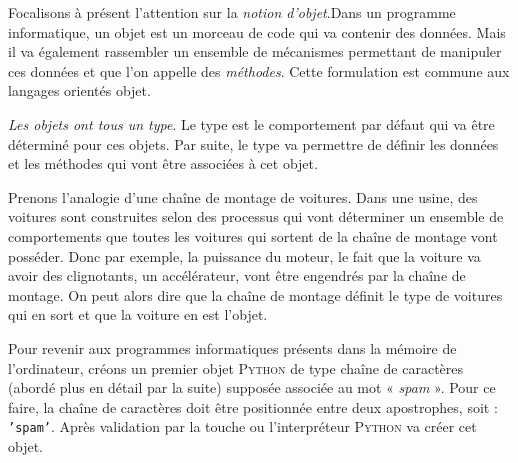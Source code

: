 Focalisons à présent l'attention sur la \emph{notion d'objet}.\nopagebreak Dans un programme informatique, un objet est un morceau de code qui va contenir des données. Mais il va également rassembler \pagebreak un ensemble de mécanismes permettant de manipuler ces données et que l'on appelle des \emph{méthodes}. Cette formulation est commune aux langages orientés objet.

\emph{Les objets ont tous un type}. Le type est le comportement par défaut qui va être déterminé pour ces objets. Par suite, le type va permettre de définir les données et les méthodes qui vont être associées à cet objet.

Prenons l'analogie d'une chaîne de montage de voitures. Dans une usine, des voitures sont construites selon des processus qui vont déterminer un ensemble de comportements que toutes les voitures qui sortent de la chaîne de montage vont posséder. Donc par exemple, la puissance du moteur, le fait que la voiture va avoir des clignotants, un accélérateur, vont être engendrés par la chaîne de montage. On peut alors dire que la chaîne de montage définit le type de voitures qui en sort et que la voiture en est l'objet.

Pour revenir aux programmes informatiques présents dans la mémoire de l'ordinateur, créons un premier objet \textsc{Python} de type chaîne de caractères (abordé plus en détail par la suite) supposée associée au mot « \textit{spam} ». Pour ce faire, la chaîne de caractères doit être positionnée entre deux apostrophes, soit : \texttt{'spam'}. Après validation par la touche  ou  l'interpréteur \textsc{Python} va créer cet objet.

